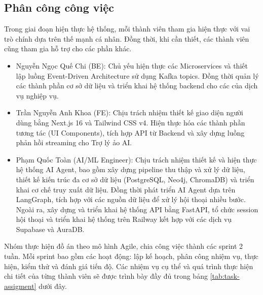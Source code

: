 \subsection{Phân công công việc}

Trong giai đoạn hiện thực hệ thống, mỗi thành viên tham gia hiện thực với vai trò chính dựa trên thế mạnh cá nhân. Đồng thời, khi cần thiết, các thành viên cũng tham gia hỗ trợ cho các phần khác.

\begin{itemize}
    \item Nguyễn Ngọc Quế Chi (BE): Chủ yếu hiện thực các Microservices và thiết lập luồng Event-Driven Architecture sử dụng Kafka topics. Đồng thời quản lý các thành phần cơ sở dữ liệu và triển khai hệ thống backend cho các của dịch vụ nghiệp vụ.
    \item Trần Nguyễn Anh Khoa (FE): Chịu trách nhiệm thiết kế giao diện người dùng bằng Next.js 16 và Tailwind CSS v4. Hiện thực hóa các thành phần tương tác (UI Components), tích hợp API từ Backend và xây dựng luồng phản hồi streaming cho Trợ lý ảo AI.
    \item Phạm Quốc Toàn (AI/ML Engineer): Chịu trách nhiệm thiết kế và hiện thực hệ thống AI Agent, bao gồm xây dựng pipeline thu thập và xử lý dữ liệu, thiết kế kiến trúc đa cơ sở dữ liệu (PostgreSQL, Neo4j, ChromaDB) và triển khai cơ chế truy xuất dữ liệu. Đồng thời phát triển AI Agent dựa trên LangGraph, tích hợp với các nguồn dữ liệu để xử lý hội thoại nhiều bước. Ngoài ra, xây dựng và triển khai hệ thống API bằng FastAPI, tổ chức session hội thoại và triển khai hệ thống trên Railway kết hợp với các dịch vụ Supabase và AuraDB.
\end{itemize}

Nhóm thực hiện đồ án theo mô hình Agile, chia công việc thành các sprint 2 tuần. Mỗi sprint bao gồm các hoạt động: lập kế hoạch, phân công nhiệm vụ, thực hiện, kiểm thử và đánh giá tiến độ. Các nhiệm vụ cụ thể và quá trình thực hiện chi tiết của từng thành viên sẽ được trình bày đầy đủ trong bảng \ref{tab:task-assigment} dưới đây.

